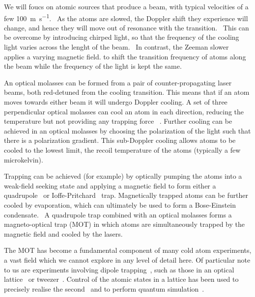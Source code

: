 We will foucs on atomic sources that produce a beam, with typical velocities of
a few \SI{100}{\metre\per\second}.~\cite{Metcalf1999}  As the atoms are slowed,
the Doppler shift they experience will change, and hence they will move out of
resonance with the transition.~\cite{RevModPhys.70.721} This can be overcome by
introducing chirped light, so that the frequency of the cooling light varies
across the lenght of the beam.~\cite{Prodan1984} In contrast, the Zeeman slower
applies a varying magnetic field. to shift the transition frequency of atoms
along the beam while the frequency of the light is kept the same.

An optical molasses can be formed from a pair of counter-propagating laser
beams, both red-detuned from the cooling transition. This means that if an atom
moves towards either beam it will undergo Doppler cooling.  A set of three
perpendicular optical molasses can cool an atom in each direction, reducing the
temperature but not providing any trapping force~\cite{Metcalf1999} . Further
cooling can be achieved in an optical molasses by choosing the polarization of
the light such that there is a polarization gradient. This sub-Doppler cooling
allows atoms to be cooled to the lowest limit, the recoil temperature of the
atoms (typically a few microkelvin).~\cite{Dalibard:89}

Trapping can be achieved (for example) by optically pumping the atoms into a
weak-field seeking state and applying a magnetic field to form either a
quadrupole~\cite{PhysRevLett.54.2596} or
Ioffe-Pritchard~\cite{PhysRevLett.51.1336} trap.  Magnetically trapped atoms can be
further cooled by evaporation, which can ultimately be used to form a
Bose-Einstein condensate.~\cite{Anderson198} A quadrupole trap combined with an
optical molasses forms a magneto-optical trap (MOT) in which atoms are
simultaneously trapped by the magnetic field and cooled by the
lasers.~\cite{PhysRevLett.59.2631}

The MOT has become a fundamental component of many cold atom experiments, a vast
field which we cannot explore in any level of detail here. Of particular note to
us are experiments involving dipole trapping~\cite{PhysRevA.47.R4567}, such as
those in an optical lattice~\cite{Bakr2009} or tweezer~\cite{Ashkin:86}. Control
of the atomic states in a lattice has been used to precisely realise the
second~\cite{PhysRevLett.120.103201} and to perform quantum
simulation~\cite{Gross995}.

